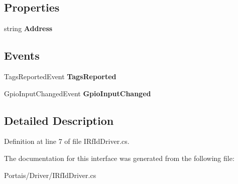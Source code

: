 \subsection*{Properties}
\begin{DoxyCompactItemize}
\item 
string {\bfseries Address}\hypertarget{interface_portais_1_1_driver_1_1_i_rf_id_driver_a0b369231018a65878a74708baef053b9}{}\label{interface_portais_1_1_driver_1_1_i_rf_id_driver_a0b369231018a65878a74708baef053b9}

\end{DoxyCompactItemize}
\subsection*{Events}
\begin{DoxyCompactItemize}
\item 
Tags\+Reported\+Event {\bfseries Tags\+Reported}\hypertarget{interface_portais_1_1_driver_1_1_i_rf_id_driver_a8f64ddc2c35b09671ed184e573b18480}{}\label{interface_portais_1_1_driver_1_1_i_rf_id_driver_a8f64ddc2c35b09671ed184e573b18480}

\item 
Gpio\+Input\+Changed\+Event {\bfseries Gpio\+Input\+Changed}\hypertarget{interface_portais_1_1_driver_1_1_i_rf_id_driver_abb06ee67858a416adf1bb506f7e244f5}{}\label{interface_portais_1_1_driver_1_1_i_rf_id_driver_abb06ee67858a416adf1bb506f7e244f5}

\end{DoxyCompactItemize}


\subsection{Detailed Description}


Definition at line 7 of file I\+Rf\+Id\+Driver.\+cs.



The documentation for this interface was generated from the following file\+:\begin{DoxyCompactItemize}
\item 
Portais/\+Driver/I\+Rf\+Id\+Driver.\+cs\end{DoxyCompactItemize}

